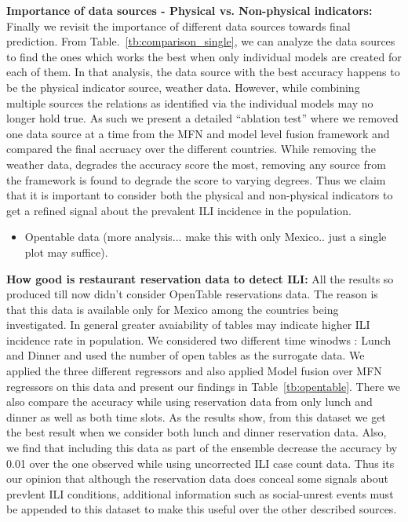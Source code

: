 {\noindent \textbf{Importance of data sources - Physical vs. Non-physical indicators: }} Finally we revisit the importance of different data sources
towards final prediction. From Table.~\ref{tb:comparison_single}, we can analyze the data sources
to find the ones which works the best when only individual models are created for each of them. 
In that analysis, the data source with the best accuracy happens to be the physical indicator source, 
weather data. However, while combining multiple sources the relations as identified via the individual models
may no longer hold true. As such we present a detailed ``ablation test'' where we removed one data source at a time
from the MFN and model level fusion framework and compared the final accruacy over the different countries. 
While removing the weather data, degrades the accuracy score the most, removing any source from the framework is found
to degrade the score to varying degrees. Thus we claim that it is important to consider both the physical 
and non-physical indicators to get a refined signal about the prevalent ILI incidence in the population.


\begin{itemize}
  \item Opentable data (more analysis... make this with only Mexico.. just a single plot may suffice). 
\end{itemize}


{\noindent \textbf{How good is restaurant reservation data to detect ILI: }} All the results so produced till now
didn't consider OpenTable reservations data. The reason is that this data is available only for Mexico among the 
countries being investigated. In general greater avaiability of tables may indicate higher ILI incidence rate in population.
We considered two different time winodws : Lunch and Dinner and used the number of open tables as the surrogate data.
We applied the three different regressors and also applied Model fusion over MFN regressors on this data and present 
our findings in Table~\ref{tb:opentable}. There we also compare the accuracy while using reservation 
data from only lunch and dinner as well as both time slots. As the results show, from this dataset we get the best 
result when we consider both lunch and dinner reservation data. Also, we find that including this data as part of the
ensemble decrease the accuracy by 0.01 over the one observed while using uncorrected ILI case count data. Thus its 
our opinion that although the reservation data does conceal some signals about prevlent ILI conditions, additional
information such as social-unrest events must be appended to this dataset to make this useful over the 
other described sources.

